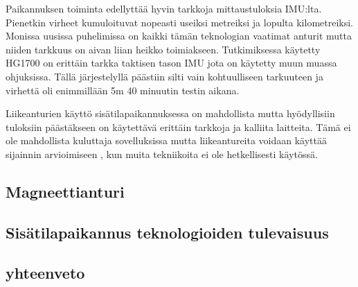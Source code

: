 Paikannuksen toiminta edellyttää hyvin tarkkoja mittaustuloksia IMU:lta. Pienetkin virheet kumuloituvat nopeasti useiksi metreiksi ja lopulta kilometreiksi. Monissa uusissa puhelimissa on kaikki tämän teknologian vaatimat anturit mutta niiden tarkkuus on aivan liian heikko toimiakseen. Tutkimiksessa\cite{IMU} käytetty HG1700 on erittäin tarkka taktisen tason IMU jota on käytetty muun muassa ohjuksissa\cite{hg1700}. Tällä järjestelyllä päästiin silti vain kohtuulliseen tarkuuteen ja virhettä oli enimmillään 5m 40 minuutin testin aikana\cite{IMU}. 

Liikeanturien käyttö sisätilapaikannuksessa on mahdollista mutta hyödyllisiin tuloksiin päästäkseen on käytettävä erittäin tarkkoja ja kalliita laitteita. Tämä ei ole mahdollista kuluttaja sovelluksissa mutta liikeantureita voidaan käyttää sijainnin arvioimiseen , kun muita tekniikoita ei ole hetkellisesti käytössä.
\subsection{Magneettianturi}
\subsection{Sisätilapaikannus teknologioiden tulevaisuus}
\subsection{yhteenveto}

